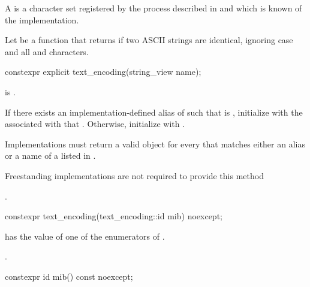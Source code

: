 \documentclass{wg21}
\begin{document}
\begin{addedblock}

\pnum A  is a character set registered by the process described in \cite{rfc2978} and which is known of the implementation.

\pnum Let  be a function that returns  if two ASCII strings are identical, ignoring case and all \tcode{-} and  \tcode{_} characters.

\pnum

\begin{itemdecl}
constexpr explicit text_encoding(string_view name);
\end{itemdecl}

\begin{itemdescr}
    \requires {} is .
    
    \effects
    If there exists an implementation-defined alias  of  such that  is , initialize
     with the  associated with that . Otherwise, initialize  with .

    Implementations must return a valid  object for every  that matches either an alias or a name of a  listed in \cite{rfc3808}.

\begin{note}
	Freestanding implementations are not required to provide this method
\end{note}

    \ensures {}.
\end{itemdescr}


\begin{itemdecl}
constexpr text_encoding(text_encoding::id mib) noexcept;
\end{itemdecl}

\begin{itemdescr}
    \requires {}  has the value of one of the enumerators of .
    
    \ensures {}.
\end{itemdescr}





\begin{itemdecl}
constexpr id mib() const noexcept;
\end{itemdecl}


\end{addedblock}
\end{document}
